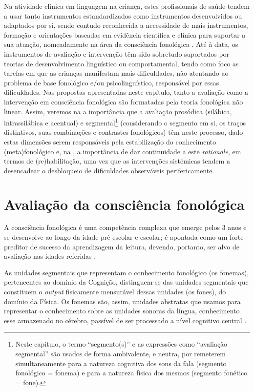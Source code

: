 \documentclass[output=paper,colorlinks,citecolor=brown,booklanguage=portuguese]{langscibook}
\begin{document}
Na atividade clínica em linguagem na criança, estes profissionais de saúde tendem a usar tanto instrumentos estandardizados como instrumentos desenvolvidos ou adaptados por si, sendo contudo reconhecida a necessidade de mais instrumentos, formação e orientações baseadas em evidência científica e clínica para suportar a sua atuação, nomeadamente na área da consciência fonológica \citep{Afonso2015, Batista2011, Alves2018, Law2017}. 
Até à data, os instrumentos de avaliação e intervenção têm sido sobretudo suportados por teorias de desenvolvimento linguístico ou comportamental, tendo como foco as tarefas em que as crianças manifestam mais dificuldades, não atentando ao problema de base fonológico e/ou psicolinguístico, responsável por essas dificuldades. Nas propostas apresentadas neste capítulo, tanto a avaliação como a intervenção em consciência fonológica são formatadas pela teoria fonológica não linear. Assim, veremos na  a importância que a avaliação prosódica (silábica, intrassilábica e acentual) e segmental\footnote{Neste capítulo, o termo “segmento(s)” e as expressões como “avaliação segmental” são usados de forma ambivalente, e neutra, por remeterem simultaneamente para a natureza cognitiva dos sons da fala (segmento fonológico = fonema) e para a natureza física dos mesmos (segmento fonético = fone).} (considerando o segmento em si, os traços distintivos, suas combinações e contrastes fonológicos) têm neste processo, dado estas dimensões serem responsáveis pela estabilização do conhecimento (meta)fonológico e, na , a importância de dar continuidade a este \emph{rationale}, em termos de (re)habilitação, uma vez que as intervenções sistémicas tendem a desencadear o desbloqueio de dificuldades observáveis perifericamente.

\section{Avaliação da consciência fonológica}\label{sec:cap10sec2}
A consciência fonológica é uma competência complexa que emerge pelos 3 anos e se desenvolve ao longo da idade pré-escolar e escolar; é apontada como um forte preditor de sucesso da aprendizagem da leitura, devendo, portanto, ser alvo de avaliação nas idades referidas \citep{Bradley1978}. 

As unidades segmentais que representam o conhecimento fonológico (os fonemas), pertencentes ao domínio da Cognição, distinguem-se das unidades segmentais que constituem o \emph{output} fisicamente mensurável dessas unidades (os fones), do domínio da Física. Os fonemas são, assim, unidades abstratas que usamos para representar o conhecimento sobre as unidades sonoras da língua, conhecimento esse armazenado no cérebro, passível de ser processado a nível cognitivo central \citep[362]{Lousada2017}. 
\end{document}
